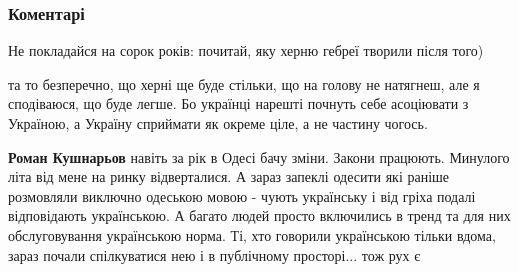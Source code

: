  
 
 
 
 
\subsubsection{Коментарі}

\begin{itemize}
 
Не покладайся на сорок років: почитай, яку херню гебреї творили після того)

\begin{itemize}
 

та то безперечно, що херні ще буде стільки, що на голову не натягнеш, але я
сподіваюся, що буде легше. Бо українці нарешті почнуть себе асоціювати з
Україною, а Україну сприймати як окреме ціле, а не частину чогось.


 
\textbf{Роман Кушнарьов} навіть за рік в Одесі бачу зміни. Закони працюють.
Минулого літа від мене на ринку відверталися. А зараз запеклі одесити які
раніше розмовляли виключно одеською мовою - чують українську і від гріха подалі
відповідають українською. А багато людей просто включились в тренд та для них
обслуговування українською норма. Ті, хто говорили українською тільки вдома,
зараз почали спілкуватися нею і в публічному просторі... тож рух є
\end{itemize}


\end{itemize}
